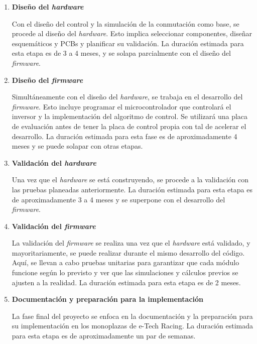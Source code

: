 \begin{enumerate}
\item \textbf{Diseño del \textit{hardware}}

Con el diseño del control y la simulación de la conmutación como base, se procede al diseño del \textit{hardware}. Esto implica seleccionar componentes, diseñar esquemáticos y PCBs y planificar su validación. La duración estimada para esta etapa es de 3 a 4 meses, y se solapa parcialmente con el diseño del \textit{firmware}.

\item \textbf{Diseño del \textit{firmware}}

Simultáneamente con el diseño del \textit{hardware}, se trabaja en el desarrollo del \textit{firmware}. Esto incluye programar el microcontrolador que controlará el inversor y la implementación del algoritmo de control. Se utilizará una placa de evaluación antes de tener la placa de control propia con tal de acelerar el desarrollo. La duración estimada para esta fase es de aproximadamente 4 meses y se puede solapar con otras etapas.

\item \textbf{Validación del \textit{hardware}}

Una vez que el \textit{hardware} se está construyendo, se procede a la validación con las pruebas planeadas anteriormente. La duración estimada para esta etapa es de aproximadamente 3 a 4 meses y se superpone con el desarrollo del \textit{firmware}.

\item \textbf{Validación del \textit{firmware}}

La validación del \textit{firmware} se realiza una vez que el \textit{hardware} está validado, y mayoritariamente, se puede realizar durante el mismo desarrollo del código. Aquí, se llevan a cabo pruebas unitarias para garantizar que cada módulo funcione según lo previsto y ver que las simulaciones y cálculos previos se ajusten a la realidad. La duración estimada para esta etapa es de 2 meses.

\item \textbf{Documentación y preparación para la implementación}

La fase final del proyecto se enfoca en la documentación y la preparación para su implementación en los monoplazas de e-Tech Racing. La duración estimada para esta etapa es de aproximadamente un par de semanas. 

\end{enumerate}

\newpage

